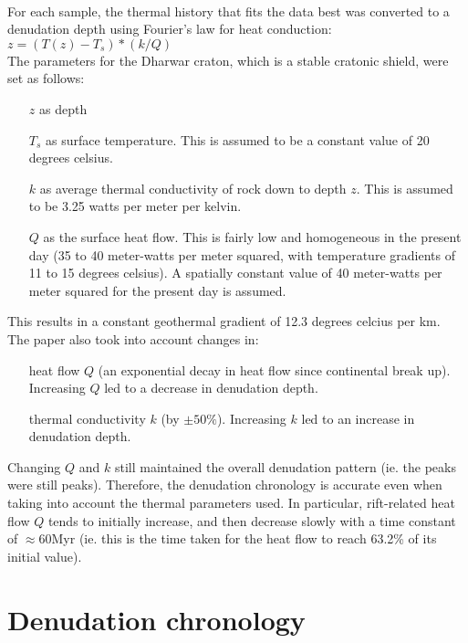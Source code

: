 \documentclass[11pt, oneside]{article}   	%
\begin{document}
\\For each sample, the thermal history that fits the data best was converted to a denudation depth using Fourier's law for heat conduction: $ z = (T(z) - T_{s})*(k/Q) $
\\The parameters for the Dharwar craton, which is a stable cratonic shield, were set as follows:
\begin{itemize}
        \item[$z$] as depth
        \item[$ T_{s}$] as surface temperature. This is assumed to be a constant value of 20 degrees celsius. 
        \item[$k$] as average thermal conductivity of rock down to depth $z$. This is assumed to be 3.25 watts per meter per kelvin.
        \item[$Q$] as the surface heat flow. This is fairly low and homogeneous in the present day (35 to 40 meter-watts per meter squared, with temperature gradients of 11 to 15 degrees celsius). A spatially constant value of 40 meter-watts per meter squared for the present day is assumed. 
\end{itemize}
This results in a constant geothermal gradient of 12.3 degrees celcius per km.
\\The paper also took into account changes in:
\begin{itemize}
        \item[heat flow $Q$] (an exponential decay in heat flow since continental break up). Increasing $Q$ led to a decrease in denudation depth.
        \item[thermal conductivity $k$] (by $\pm 50 \%$). Increasing $k$ led to an increase in denudation depth.
\end{itemize}
Changing $Q$ and $k$ still maintained the overall denudation pattern (ie. the peaks were still peaks). Therefore, the denudation chronology is accurate even when taking into account the thermal parameters used. In particular, rift-related heat flow $Q$ tends to initially increase, and then decrease slowly with a time constant of $\approx$60Myr (ie. this is the time taken for the heat flow to reach 63.2\% of its initial value).
\\ 


\section{Denudation chronology}
\end{document}
